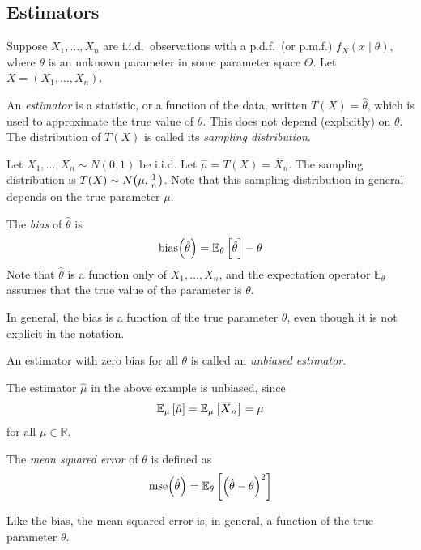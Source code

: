 \subsection{Estimators}
Suppose \( X_1, \dots, X_n \) are i.i.d.\ observations with a p.d.f.\ (or p.m.f.) \( f_X(x \mid \theta) \), where \( \theta \) is an unknown parameter in some parameter space \( \Theta \).
Let \( X = (X_1, \dots, X_n) \).
\begin{definition}
	An \textit{estimator} is a statistic, or a function of the data, written \( T(X) = \hat\theta \), which is used to approximate the true value of \( \theta \).
	This does not depend (explicitly) on \( \theta \).
	The distribution of \( T(X) \) is called its \textit{sampling distribution}.
\end{definition}
\begin{example}
	Let \( X_1, \dots, X_n \sim N(0,1) \) be i.i.d.
	Let \( \hat \mu = T(X) = \overline X_n \).
	The sampling distribution is \( T(X) \sim N\qty(\mu, \frac{1}{n}) \).
	Note that this sampling distribution in general depends on the true parameter \( \mu \).
\end{example}
\begin{definition}
	The \textit{bias} of \( \hat \theta \) is
	\[
		\mathrm{bias}\qty(\hat \theta) = \mathbb{E}_{\theta}\left[{\hat \theta}\right] - \theta
	\]
	Note that \( \hat \theta \) is a function only of \( X_1, \dots, X_n \), and the expectation operator \( \mathbb E_\theta \) assumes that the true value of the parameter is \( \theta \).
\end{definition}
\begin{remark}
	In general, the bias is a function of the true parameter \( \theta \), even though it is not explicit in the notation.
\end{remark}
\begin{definition}
	An estimator with zero bias for all \( \theta \) is called an \textit{unbiased estimator}.
\end{definition}
\begin{example}
	The estimator \( \hat \mu \) in the above example is unbiased, since
	\[
		\mathbb{E}_{\mu}\left[{\hat \mu}\right] = \mathbb{E}_{\mu}\left[{\overline X_n}\right] = \mu
	\]
	for all \( \mu \in \mathbb R \).
\end{example}
\begin{definition}
	The \textit{mean squared error} of \( \theta \) is defined as
	\[
		\mathrm{mse}\qty(\hat \theta) = \mathbb{E}_{\theta}\left[{\qty(\hat \theta - \theta)^2}\right]
	\]
\end{definition}
\begin{remark}
	Like the bias, the mean squared error is, in general, a function of the true parameter \( \theta \).
\end{remark}

